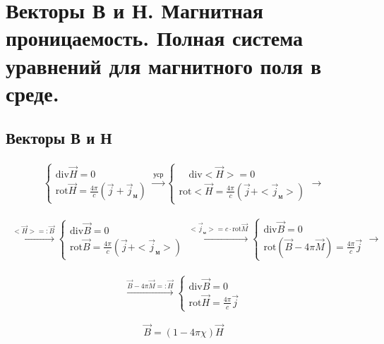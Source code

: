 \section{Векторы В и Н. Магнитная проницаемость. Полная система уравнений для
магнитного поля в среде.}

\subsection*{Векторы В и Н}

\[
\begin{aligned}
    \begin{cases}
        \mathrm{div}\vec{H}=0  \\ 
        \mathrm{rot}\vec{H}=\frac{4\pi}{c}(\vec{j}+\vec{j}_{\text{м}})
    \end{cases}
    \overset{\text{уср}}{\rightarrow}
    \begin{cases}
        \quad \mathrm{div}<\vec{H}>=0 \\
        \mathrm{rot}<\vec{H}= \frac{4\pi}{c}(\vec{j}+<\vec{j}_{\text{м}}>)
    \end{cases}
    \rightarrow
\end{aligned}
\]

\[
\begin{aligned}
    \overset{<\vec{H}>=:\vec{B}}{\rightarrow}
    \begin{cases}
        \mathrm{div}\vec{B}=0 \\
        \mathrm{rot}\vec{B}= \frac{4\pi}{c}(\vec{j}+<\vec{j}_{\text{м}}>)
    \end{cases}
    \overset{<\vec{j}_{\text{м}}>=c\cdot \mathrm{rot}\vec{M}}{\rightarrow}
    \begin{cases}
        \mathrm{div}\vec{B}=0 \\
        \mathrm{rot}(\vec{B}-4\pi\vec{M})= \frac{4\pi}{c}\vec{j}
    \end{cases}
    \rightarrow 
\end{aligned}
\]

\[
\begin{aligned}
    \overset{\vec{B}-4\pi\vec{M}=:\vec{H}}{\rightarrow}
    \boxed{\begin{cases}
        \mathrm{div}\vec{B}=0 \\
        \mathrm{rot}\vec{H}= \frac{4\pi}{c}\vec{j}
    \end{cases}
    }
\end{aligned}
\]

\[
\vec{B}=(1-4\pi\chi)\vec{H}
\]

